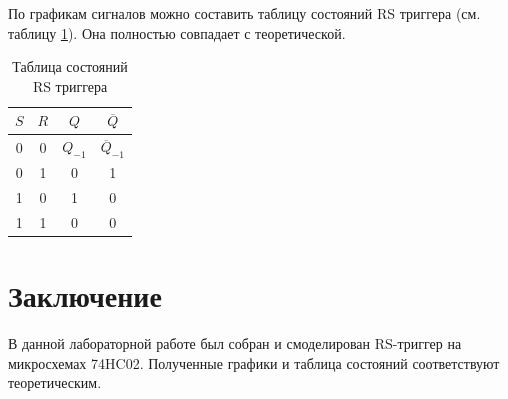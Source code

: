 По графикам сигналов можно составить таблицу состояний RS триггера (см. таблицу \ref{tab:rsff_table}).
Она полностью совпадает с теоретической.


\begin{table}
    \centering
    \caption{Таблица состояний RS триггера}
    \begin{tabular}{|c|c|c|c|}
        \hline
        $S$&$R$&$Q$&$\overline Q$\\
        \hline
        0&0&$Q_{-1}$&$\overline Q_{-1}$\\
        \hline
        0&1&0&1\\
        \hline
        1&0&1&0\\
        \hline
        1&1&0&0\\
        \hline
    \end{tabular}
    \label{tab:rsff_table}
\end{table}




\section*{Заключение}

В данной лабораторной работе был собран и смоделирован
RS-триггер на микросхемах 74HC02. 
Полученные графики и таблица состояний соответствуют теоретическим.